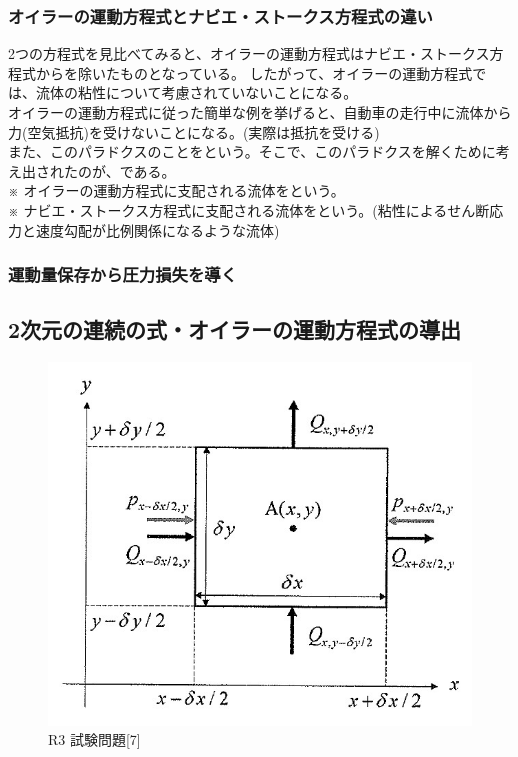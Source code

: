 \documentclass[a4paper]{jsarticle}
\begin{document}
\subsubsection{オイラーの運動方程式とナビエ・ストークス方程式の違い}
2つの方程式を見比べてみると、オイラーの運動方程式はナビエ・ストークス方程式からを除いたものとなっている。
したがって、オイラーの運動方程式では、流体の粘性について考慮されていないことになる。\\
オイラーの運動方程式に従った簡単な例を挙げると、自動車の走行中に流体から力(空気抵抗)を受けないことになる。(実際は抵抗を受ける)\\
また、このパラドクスのことをという。そこで、このパラドクスを解くために考え出されたのが、である。\\
※ オイラーの運動方程式に支配される流体をという。\\
※ ナビエ・ストークス方程式に支配される流体をという。(粘性によるせん断応力と速度勾配が比例関係になるような流体)
\subsubsection{運動量保存から圧力損失を導く}
\subsection{2次元の連続の式・オイラーの運動方程式の導出}
\begin{figure}[htbp]
    \begin{center}
        \includegraphics[width=120mm]{images/continuity_equation.jpg}
        \caption{R3 試験問題[7]}
    \end{center}
\end{figure}
\end{document}
